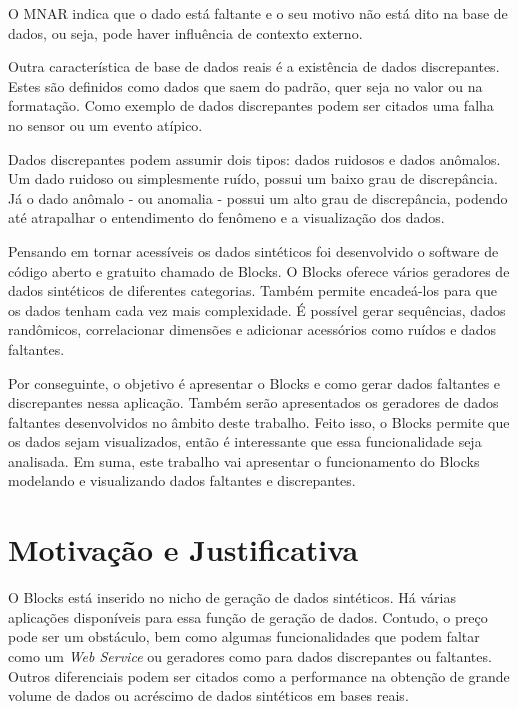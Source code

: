 \documentclass[
	12pt,				%
	openright,			%
	oneside,			%
	a4paper,			%
	english,			%
	brazil				%
	]{abntex2}
\begin{document}
	O MNAR indica que o dado está faltante e o seu motivo não está dito na base de dados, ou seja, pode haver influência de contexto externo.
	\par
	Outra característica de base de dados reais é a existência de dados discrepantes.
	Estes são definidos como dados que saem do padrão, quer seja no valor ou na formatação. \cite{Aggarwal2012}
	Como exemplo de dados discrepantes podem ser citados uma falha no sensor ou um evento atípico.
	\par
	Dados discrepantes podem assumir dois tipos: dados ruidosos e dados anômalos.
	Um dado ruidoso ou simplesmente ruído, possui um baixo grau de discrepância.
	Já o dado anômalo - ou anomalia - possui um alto grau de discrepância, podendo até atrapalhar o entendimento do fenômeno e a visualização dos dados.
	\par
	Pensando em tornar acessíveis os dados sintéticos foi desenvolvido o software de código aberto e gratuito chamado de Blocks.
	O Blocks oferece vários geradores de dados sintéticos de diferentes categorias.
	Também permite encadeá-los para que os dados tenham cada vez mais complexidade.
	É possível gerar sequências, dados randômicos, correlacionar dimensões e adicionar acessórios como ruídos e dados faltantes.
	\par
	Por conseguinte, o objetivo é apresentar o Blocks e como gerar dados faltantes e discrepantes nessa aplicação.
	Também serão apresentados os geradores de dados faltantes desenvolvidos no âmbito deste trabalho.
	Feito isso, o Blocks permite que os dados sejam visualizados, então é interessante que essa funcionalidade seja analisada.
	Em suma, este trabalho vai apresentar o funcionamento do Blocks modelando e visualizando dados faltantes e discrepantes.
	\section{Motivação e Justificativa}
		O Blocks está inserido no nicho de geração de dados sintéticos.
		Há várias aplicações disponíveis para essa função de geração de dados.
		Contudo, o preço pode ser um obstáculo, bem como algumas funcionalidades que podem faltar como um \emph{Web Service} ou geradores como para dados discrepantes ou faltantes.
		Outros diferenciais podem ser citados como a performance na obtenção de grande volume de dados ou acréscimo de dados sintéticos em bases reais.
\end{document}
